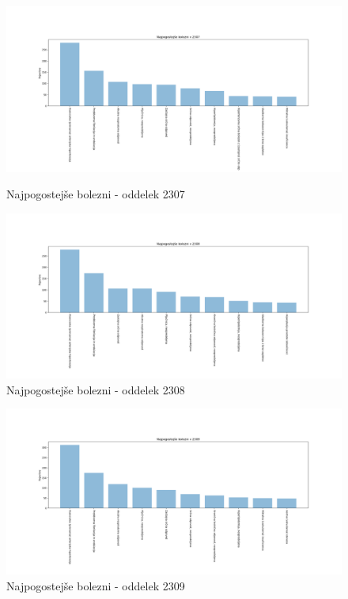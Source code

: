 \documentclass[a4paper,12pt]{report}
\begin{document}
\begin{center}
   \begin{figure}[!htb]
      \centering
         \begin{minipage}[b]{0.4\textwidth}
            \noindent\includegraphics[width=\linewidth]{./grafi/2307.png}
            \caption{Najpogostejše bolezni - oddelek 2307}
         \end{minipage}
         \hfill
         \begin{minipage}[b]{0.4\textwidth}
            \noindent\includegraphics[width=\linewidth]{./grafi/2308.png}
            \caption{Najpogostejše bolezni - oddelek 2308}
         \end{minipage}
   \end{figure}

   \begin{figure}[!htb]
      \centering
         \begin{minipage}[b]{0.4\textwidth}
            \noindent\includegraphics[width=\linewidth]{./grafi/2309.png}
            \caption{Najpogostejše bolezni - oddelek 2309}
         \end{minipage}
         \hfill
   \end{figure}


\end{center}
\end{document}
